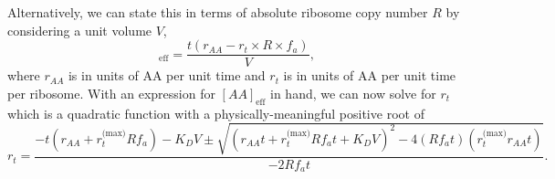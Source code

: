Alternatively, we can state this in terms of absolute ribosome copy number $R$
by considering a unit volume $V$,
\begin{equation}
   [AA]_\text{eff} = \frac{t(r_{AA} - r_t \times R \times f_a)}{V},
   \label{eq:aa_final}
\end{equation}
where $r_{AA}$ is in units of AA per unit time and $r_t$ is in units of AA per
unit time per ribosome. With an expression for $[AA]_\text{eff}$ in hand, we can now solve
 for $r_t$ which is a quadratic function with a
physically-meaningful positive root of
\begin{equation}
r_t = \frac{-t(r_{AA} + r_t^\text{(max)}Rf_a) - K_D V \pm \sqrt{(r_{AA}t + r_t^\text{(max)}Rf_at + K_D V)^2 - 4(Rf_at)(r_t^\text{(max)}r_{AA} t)}}{-2Rf_at}.
\label{eq:rt_root}
\end{equation}

